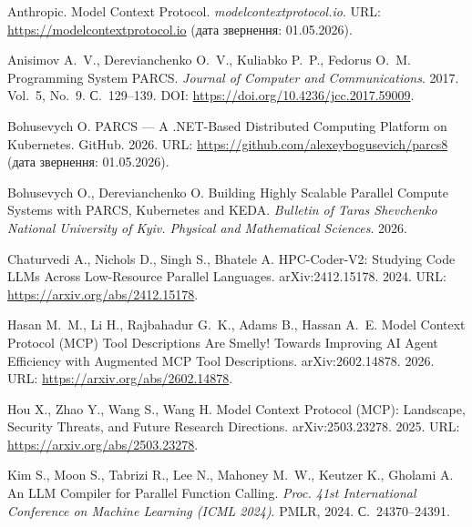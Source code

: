 
\begin{citreflist}

\item Anthropic.
  Model Context Protocol.
  \textit{modelcontextprotocol.io}.
  URL: \url{https://modelcontextprotocol.io}
  (дата звернення: 01.05.2026).

\item Anisimov A.~V., Derevianchenko O.~V., Kuliabko P.~P., Fedorus O.~M.
  Programming System PARCS.
  \textit{Journal of Computer and Communications}.
  2017. Vol.~5, No.~9. С.~129--139.
  DOI: \url{https://doi.org/10.4236/jcc.2017.59009}.

\item Bohusevych O.
  PARCS --- A .NET-Based Distributed Computing Platform on Kubernetes.
  GitHub. 2026.
  URL: \url{https://github.com/alexeybogusevich/parcs8}
  (дата звернення: 01.05.2026).

\item Bohusevych O., Derevianchenko O.
  Building Highly Scalable Parallel Compute Systems with PARCS, Kubernetes and KEDA.
  \textit{Bulletin of Taras Shevchenko National University of Kyiv. Physical and Mathematical Sciences}.
  2026.

\item Chaturvedi A., Nichols D., Singh S., Bhatele A.
  HPC-Coder-V2: Studying Code LLMs Across Low-Resource Parallel Languages.
  arXiv:2412.15178. 2024.
  URL: \url{https://arxiv.org/abs/2412.15178}.

\item Hasan M.~M., Li H., Rajbahadur G.~K., Adams B., Hassan A.~E.
  Model Context Protocol (MCP) Tool Descriptions Are Smelly!
  Towards Improving AI Agent Efficiency with Augmented MCP Tool Descriptions.
  arXiv:2602.14878. 2026.
  URL: \url{https://arxiv.org/abs/2602.14878}.

\item Hou X., Zhao Y., Wang S., Wang H.
  Model Context Protocol (MCP): Landscape, Security Threats, and Future Research Directions.
  arXiv:2503.23278. 2025.
  URL: \url{https://arxiv.org/abs/2503.23278}.

\item Kim S., Moon S., Tabrizi R., Lee N., Mahoney M.~W., Keutzer K., Gholami A.
  An LLM Compiler for Parallel Function Calling.
  \textit{Proc. 41st International Conference on Machine Learning (ICML 2024)}.
  PMLR, 2024.
  С.~24370--24391.


\end{citreflist}
